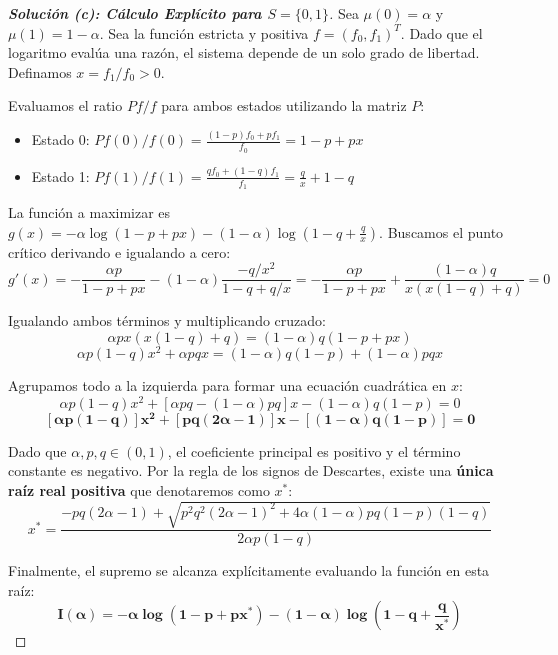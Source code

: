\documentclass[10pt,a4paper]{article}
\begin{document}
\begin{proof}[\textbf{Solución (c): Cálculo Explícito para $S=\{0,1\}$}]
    Sea $\mu(0) = \alpha$ y $\mu(1) = 1-\alpha$. 
    Sea la función estricta y positiva $f = (f_0, f_1)^T$. Dado que el logaritmo evalúa una razón, el sistema depende de un solo grado de libertad. Definamos $x = f_1 / f_0 > 0$.
    
    Evaluamos el ratio $Pf/f$ para ambos estados utilizando la matriz $P$:
    \begin{itemize}
        \item Estado 0: $Pf(0)/f(0) = \frac{(1-p)f_0 + p f_1}{f_0} = 1 - p + px$
        \item Estado 1: $Pf(1)/f(1) = \frac{q f_0 + (1-q)f_1}{f_1} = \frac{q}{x} + 1 - q$
    \end{itemize}
    
    La función a maximizar es $g(x) = -\alpha \log(1-p+px) - (1-\alpha) \log \left( 1-q+\frac{q}{x} \right)$.
    Buscamos el punto crítico derivando e igualando a cero:
    \[ g'(x) = -\frac{\alpha p}{1-p+px} - (1-\alpha) \frac{-q/x^2}{1-q+q/x} = -\frac{\alpha p}{1-p+px} + \frac{(1-\alpha) q}{x(x(1-q)+q)} = 0 \]
    
    Igualando ambos términos y multiplicando cruzado:
    \[ \alpha p x (x(1-q)+q) = (1-\alpha) q (1-p+px) \]
    \[ \alpha p (1-q) x^2 + \alpha p q x = (1-\alpha) q (1-p) + (1-\alpha) p q x \]
    
    Agrupamos todo a la izquierda para formar una ecuación cuadrática en $x$:
    \[ \alpha p (1-q) x^2 + [\alpha p q - (1-\alpha) p q] x - (1-\alpha) q (1-p) = 0 \]
    \[ \mathbf{[\alpha p (1-q)] x^2 + [pq(2\alpha - 1)] x - [(1-\alpha) q (1-p)] = 0} \]
    
    Dado que $\alpha, p, q \in (0,1)$, el coeficiente principal es positivo y el término constante es negativo. Por la regla de los signos de Descartes, existe una \textbf{única raíz real positiva} que denotaremos como $x^*$:
    \[ x^* = \frac{-pq(2\alpha-1) + \sqrt{p^2q^2(2\alpha-1)^2 + 4\alpha(1-\alpha)pq(1-p)(1-q)}}{2\alpha p (1-q)} \]
    
    Finalmente, el supremo se alcanza explícitamente evaluando la función en esta raíz:
    \[ \mathbf{I(\alpha) = -\alpha \log(1 - p + p x^*) - (1-\alpha) \log \left( 1 - q + \frac{q}{x^*} \right)} \]
\end{proof}

\vspace{5mm}
\end{document}
